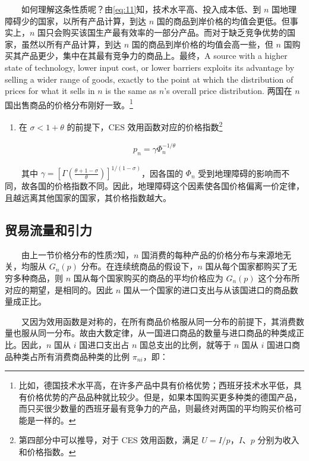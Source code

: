 \documentclass[
]{article}
\providecommand{\tightlist}{%
  \setlength{\itemsep}{0pt}\setlength{\parskip}{0pt}}
\begin{document}
　　如何理解这条性质呢？由\eqref{eq:11}知，技术水平高、投入成本低、到 \(n\) 国地理障碍少的国家，以所有产品计算，到达 \(n\) 国的商品到岸价格的均值会更低。但事实上，\(n\) 国只会购买该国生产最有效率的一部分产品。而对于缺乏竞争优势的国家，虽然以所有产品计算，到达 \(n\) 国的商品到岸价格的均值会高一些，但 \(n\) 国购买其产品更少，集中在其最有竞争力的商品上。最终，A source with a higher state of technology, lower input cost, or lower barriers exploits its advantage by selling a wider range of goods, exactly to the point at which the distribution of prices for what it sells in \(n\) is the same as \(n\)'s overall price distribution. 两国在 \(n\) 国出售商品的价格分布刚好一致。\footnote{比如，德国技术水平高，在许多产品中具有价格优势；西班牙技术水平低，具有价格优势的产品品种就比较少。但是，如果本国购买更多种类的德国产品，而只买很少数量的西班牙最有竞争力的产品，则最终对两国的平均购买价格可能是一样的。}

\begin{enumerate}
\def\labelenumi{\arabic{enumi}.}
\setcounter{enumi}{2}
\tightlist
\item
  在 \(\sigma < 1 + \theta\) 的前提下，CES 效用函数对应的价格指数\footnote{第四部分中可以推导，对于 CES 效用函数，满足 \(U=I/p\)，\(I、p\) 分别为收入和价格指数。}
\end{enumerate}

\begin{align}
p_{n}=\gamma \Phi_{n}^{-1 / \theta}  \label{eq:9}
\end{align}

　　其中 \(\gamma=\left[\Gamma\left(\frac{\theta+1-\sigma}{\theta}\right)\right]^{1 /(1-\sigma)}\)，因各国的 \(\Phi_{n}\) 受到地理障碍的影响而不同，故各国的价格指数不同。因此，地理障碍这个因素使各国价格偏离一价定律，且越远离其他国家的国家，其价格指数越大。

\hypertarget{ux8d38ux6613ux6d41ux91cfux548cux5f15ux529b}{%
\subsection{贸易流量和引力}\label{ux8d38ux6613ux6d41ux91cfux548cux5f15ux529b}}

　　由上一节价格分布的性质2知，\(n\) 国消费的每种产品的价格分布与来源地无关，均服从 \(G_n(p)\) 分布。在连续统商品的假设下，\(n\) 国从每个国家都购买了无穷多种商品，则 \(n\) 国从每个国家购买的商品的平均价格应为 \(G_n(p)\) 这个分布所对应的期望，是相同的。因此 \(n\) 国从一个国家的进口支出与从该国进口的商品数量成正比。

　　又因为效用函数是对称的，在所有商品价格服从同一分布的前提下，其消费数量也服从同一分布。故由大数定律，从一国进口商品的数量与进口商品的种类成正比。因此，\(n\) 国从 \(i\) 国进口支出占 \(n\) 国总支出的比例，就等于 \(n\) 国从 \(i\) 国进口商品种类占所有消费商品种类的比例 \(\pi_{ni}\)，即：
\end{document}
